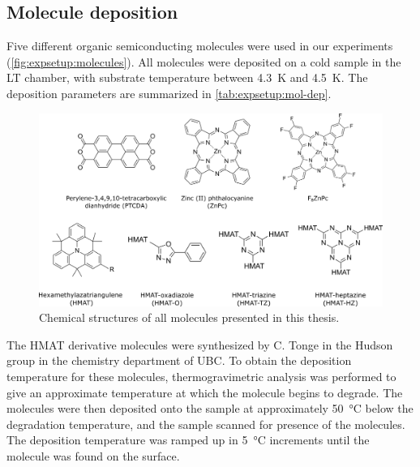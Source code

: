\subsection*{Molecule deposition}

Five different organic semiconducting molecules were used in our experiments (\autoref{fig:expsetup:molecules}). All molecules were deposited on a cold sample in the \ac{LT} chamber, with substrate temperature between \SI{4.3}{K} and \SI{4.5}{K}. The deposition parameters are summarized in \autoref{tab:expsetup:mol-dep}. 

\begin{figure} [H]
    \centering
    \includegraphics[width=\textwidth]{pictures/chemical_structures.png}
    \caption{Chemical structures of all molecules presented in this thesis. }
    \label{fig:expsetup:molecules}
\end{figure}

The \ac{HMAT} derivative molecules were synthesized by C. Tonge in the Hudson group in the chemistry department of \ac{UBC}. To obtain the deposition temperature for these molecules, thermogravimetric analysis was performed to give an approximate temperature at which the molecule begins to degrade. The molecules were then deposited onto the sample at approximately \SI{50}{\celsius} below the degradation temperature, and the sample scanned for presence of the molecules. The deposition temperature was ramped up in \SI{5}{\celsius} increments until the molecule was found on the surface.

